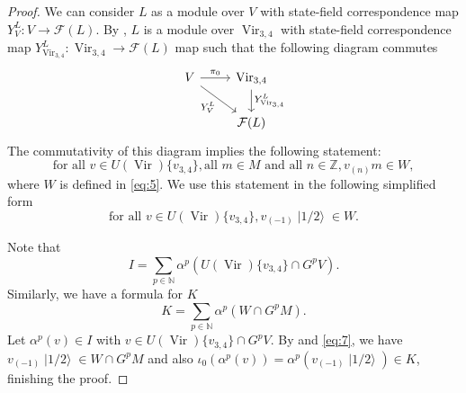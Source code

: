 \documentclass[a4paper, 12pt, reqno]{amsart}
\theoremstyle{remark}
\DeclareMathOperator{\Vir}{Vir}
\DeclareMathOperator{\vachalf}{|1/2\rangle}
\begin{document}
\begin{proof}
  We can consider $L$ as a module over $V$ with state-field correspondence map $Y^L_{V}: V \to \mathcal{F}(L)$.
  By \cite[Theorem 4.2]{wang_rationality_1993}, $L$ is a module over $\Vir_{3,4}$ with state-field correspondence map $Y^L_{\Vir_{3, 4}}: \Vir_{3, 4} \to \mathcal{F}(L)$ map such that the following diagram commutes
  \begin{equation*}
    \begin{tikzcd}
      V \arrow[r, "\pi_0"] \arrow[rd, "{Y^{L}_{V}}"'] & {\Vir_{3, 4}} \arrow[d, "{Y^{L}_{\Vir_{3, 4}}}"] \\
      & {\mathcal{F}(L)}
    \end{tikzcd}
  \end{equation*}
  The commutativity of this diagram implies the following statement:
  \begin{equation*}
    \text{for all }v \in U(\Vir)\{v_{3, 4}\}, \text{all } m \in M\text{ and  all }n \in \mathbb{Z}, v_{(n)}m \in W,
  \end{equation*}
  where $W$ is defined in \eqref{eq:5}.
  We use this statement in the following simplified form
  \begin{equation}
    \label{eq:7}
    \text{for all }v \in U(\Vir)\{v_{3, 4}\}, v_{(-1)}\vachalf \in W.
  \end{equation}
  
  Note that
  \begin{equation*}
    I = \sum_{p \in \mathbb{N}}\alpha^p(U(\Vir)\{v_{3, 4}\} \cap G^pV).
  \end{equation*}
  Similarly, we have a formula for $K$
  \begin{equation*}
    K = \sum_{p \in \mathbb{N}}\alpha^p(W \cap G^pM).
  \end{equation*}
  Let $\alpha^p(v) \in I$ with $v \in U(\Vir)\{v_{3, 4}\} \cap G^pV$.
  By  and \eqref{eq:7}, we have $v_{(-1)}\vachalf \in W \cap G^pM$ and also $\iota_0(\alpha^p(v)) = \alpha^p(v_{(-1)}\vachalf) \in K$, finishing the proof.
\end{proof}
\end{document}

